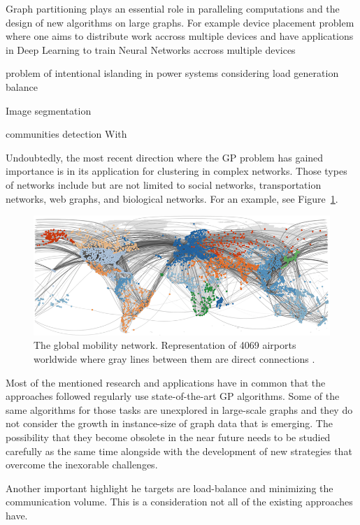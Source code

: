 Graph partitioning plays an essential role in paralleling computations and the design of new algorithms on large graphs. For example device placement problem where one aims to distribute work accross multiple devices and have applications in Deep Learning to train Neural Networks accross multiple devices \cite{deviceplacement} 

problem of intentional islanding in power systems considering load generation balance ~\cite{islanding}

Image segmentation~\cite{imagesegmentation}

communities detection
With

Undoubtedly, the most recent direction where the GP problem has gained importance is in its application for clustering in complex networks. Those types of networks include but are not limited to social networks, transportation networks, web graphs, and biological networks. For an example, see Figure~\ref{fig:complexnetwork}.

\begin{figure}[h!]
    \centering
    \includegraphics[scale=0.5]{complex_networks.png}
    \caption{The global mobility network. Representation of 4069 airports worldwide where gray lines between them are direct connections \cite{complexnetworks}.}
    \label{fig:complexnetwork}
\end{figure}

Most of the mentioned research and applications have in common that the approaches followed regularly use state-of-the-art GP algorithms. Some of the same algorithms for those tasks are unexplored in large-scale graphs and they do not consider the growth in instance-size of graph data that is emerging. The possibility that they become obsolete in the near future needs to be studied carefully as the same time alongside with the development of new strategies that overcome the inexorable challenges.

Another important highlight he targets are load-balance and minimizing the communication volume. This is a consideration not all of the existing approaches have.

